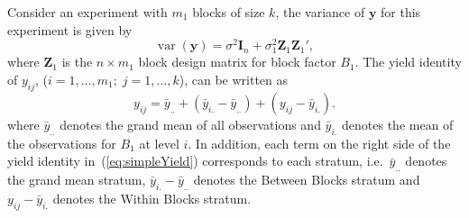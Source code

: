 \documentclass[article]{jss}
\newcommand{\I}{\mathbf{I}}
\newcommand{\Z}{\mathbf{Z}}
\begin{document}
Consider an experiment with $m_1$ blocks of size $k$, the variance of $\bm{y}$ for this experiment is given by 
\begin{equation}
\label{eq:varMat1}
\operatorname{var}(\bm{y}) = \sigma^2\I_n + \sigma_1^2 \Z_1\Z_1',
\end{equation}
where $\Z_1$ is the $n \times m_1$ block design matrix for block factor $B_1$. The yield identity of $y_{ij}$, ($i = 1, \dots, m_1;\; j = 1, \dots, k $), can be written as
\begin{equation}\label{eq:simpleYield}
y_{ij} = \bar{y}_{..} + (\bar{y}_{i.} - \bar{y}_{..}) + (y_{ij} - \bar{y}_{i.}).
\end{equation}
where $\bar{y}_{..}$ denotes the grand mean of all observations and $\bar{y}_{i.}$ denotes the mean of the observations for $B_1$ at level $i$. In addition, each term on the right side of the yield identity in~(\ref{eq:simpleYield}) corresponds to each stratum, i.e.\ $\bar{y}_{..}$ denotes the grand mean stratum, $\bar{y}_{i.} - \bar{y}_{..}$ denotes the Between Blocks stratum and $y_{ij} - \bar{y}_{i.}$ denotes the Within Blocks stratum. 
\end{document}
